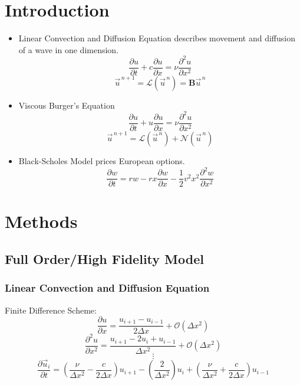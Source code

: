\documentclass{a0poster}
\begin{document}
\begin{multicols}{3}

\color{Black} %
\section{Introduction}
\LARGE
\begin{itemize}
  \item Linear Convection and Diffusion Equation describes movement and diffusion of a wave in one dimension.
  $$\frac{\partial u}{\partial t} + c \frac{\partial u}{\partial x} = \nu \frac{\partial^2 u}{\partial x^2}$$
  $$\vec{u}^{\,n+1} = \mathcal{L}(\vec{u}^{\,n}) = \mathrm{\textbf{B}} \vec{u}^{\,n}$$
    
  \item Viscous Burger's Equation
  $$\frac{\partial u}{\partial t} + u \frac{\partial u}{\partial x} = \nu \frac{\partial^2 u}{\partial x^2}$$
  $$\vec{u}^{\,n+1} = \mathcal{L}(\vec{u}^{\,n}) + \mathcal{N}(\vec{u}^{\,n})$$
  
  \item Black-Scholes Model prices European options.
  $$\frac{\partial w}{\partial t} = rw - rx \frac{\partial w}{\partial x} - \frac{1}{2} v^2 x^2 \frac{\partial^2 w}{\partial x^2}$$
\end{itemize}


\section{Methods}
\LARGE
\subsection{Full Order/High Fidelity Model}
\subsubsection{Linear Convection and Diffusion Equation}
Finite Difference Scheme:
$$\frac{\partial u}{\partial x} = \frac{u_{i+1} - u_{i-1}}{2 \Delta x} + \mathcal{O}(\Delta x^2)$$
$$\frac{\partial^2 u}{\partial x^2} = \frac{u_{i+1} - 2u_i + u_{i-1}}{\Delta x^2} + \mathcal{O}(\Delta x^2)$$
$$\vdots$$
\Large
$$\frac{\partial \vec{u}_i}{\partial t} = \left(\frac{\nu}{\Delta x^2} - \frac{c}{2 \Delta x}\right)u_{i+1} - \left(\frac{2}{\Delta x^2}\right) u_i + \left( \frac{\nu}{\Delta x^2} + \frac{c}{2 \Delta x} \right) u_{i-1}$$
\LARGE

\end{multicols}
\end{document}
